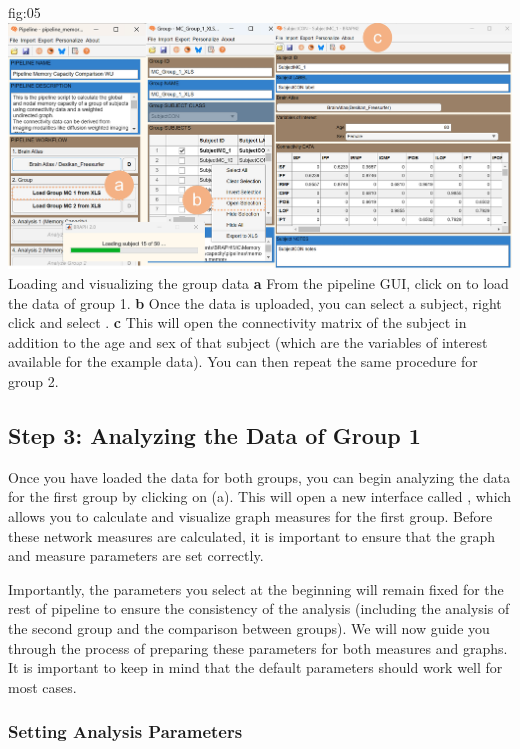 \documentclass[justified]{tufte-handout}
\begin{document}
{fig:05}
{
	\includegraphics{fig05.jpg}
}
{Loading and visualizing the group data}
{
	{\bf a} From the pipeline GUI, click on  to load the data of group 1.
	{\bf b} Once the data is uploaded, you can select a subject, right click and select .
	{\bf c} This will open the connectivity matrix of the subject in addition to the age and sex of that subject (which are the variables of interest available for the example data).
	You can then repeat the same procedure for group 2.
}



\clearpage
\subsection{Step 3: Analyzing the Data of Group 1}

Once you have loaded the data for both groups, you can begin analyzing the data for the first group by clicking on  (a). 
This will open a new interface called , which allows you to calculate and visualize graph measures for the first group. 
Before these network measures are calculated, it is important to ensure that the graph and measure parameters are set correctly.

Importantly, the parameters you select at the beginning will remain fixed for the rest of pipeline to ensure the consistency of the analysis (including the analysis of the second group and the comparison between groups). We will now guide you through the process of preparing these parameters for both measures and graphs. It is important to keep in mind that the default parameters should work well for most cases.

\subsubsection{Setting Analysis Parameters}
\end{document}
